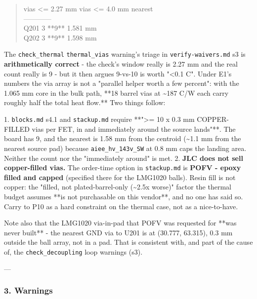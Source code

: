 \documentclass[11pt,a4paper]{article}
\begin{document}
\begin{quote}\small\ttfamily\raggedright
\textbar{} \textbar{} vias \textless{}= 2.27 mm \textbar{} vias \textless{}= 4.0 mm \textbar{} nearest \textbar{}\\
\textbar{}---\textbar{}---\textbar{}---\textbar{}---\textbar{}\\
\textbar{} Q201 \textbar{} 3 \textbar{} {*}{*}9{*}{*} \textbar{} 1.581 mm \textbar{}\\
\textbar{} Q202 \textbar{} 3 \textbar{} {*}{*}9{*}{*} \textbar{} 1.598 mm \textbar{}
\end{quote}
The \texttt{check\_thermal} \texttt{thermal\_vias} warning's triage in \texttt{verify-waivers.md} s3 is \textbf{arithmetically correct} - the check's window really is 2.27 mm and the real count really is 9 - but it then argues 9-vs-10 is worth "\textless{}0.1 C". Under E1's numbers the via array is not a "parallel helper worth a few percent": with the 1.065 mm core in the bulk path, {*}{*}18 barrel vias at \textasciitilde{}187 C/W each carry roughly half the total heat flow.{*}{*} Two things follow:

1. \texttt{blocks.md} s4.1 and \texttt{stackup.md} require {*}{*}"\textgreater{}= 10 x 0.3 mm COPPER-FILLED vias per FET, in and immediately around the source lands"{*}{*}. The board has 9, and the nearest is 1.58 mm from the centroid (\textasciitilde{}1.1 mm from the nearest source pad) because \texttt{aiee\_hv\_143v\_SW} at 0.8 mm caps the landing area. Neither the count nor the "immediately around" is met. 2. \textbf{JLC does not sell copper-filled vias.} The order-time option in \texttt{stackup.md} is \textbf{POFV - epoxy filled and capped} (specified there for the LMG1020 balls). Resin fill is not copper: the "filled, not plated-barrel-only (\textasciitilde{}2.5x worse)" factor the thermal budget assumes {*}{*}is not purchasable on this vendor{*}{*}, and no one has said so. Carry to P10 as a hard constraint on the thermal case, not as a nice-to-have.

Note also that the LMG1020 via-in-pad that POFV was requested for {*}{*}was never built{*}{*} - the nearest GND via to U201 is at (30.777, 63.315), 0.3 mm outside the ball array, not in a pad. That is consistent with, and part of the cause of, the \texttt{check\_decoupling} loop warnings (s3).

---

\subsubsection*{3. Warnings}
\end{document}
